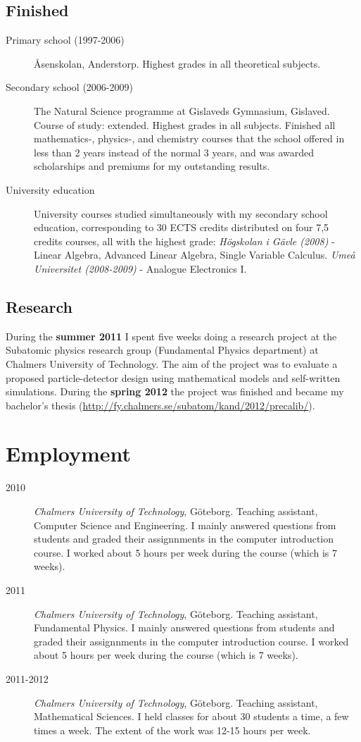 \subsection*{Finished}
\begin{description}
\item[Primary school (1997-2006)] Åsenskolan, Anderstorp. Highest grades in all theoretical subjects.
\item[Secondary school (2006-2009)] The Natural Science programme at Gislaveds Gymnasium, Gislaved. Course of study: extended. Highest grades in all subjects. Finished all mathematics-, physics-, and chemistry courses that the school offered in less than 2 years instead of the normal 3 years, and was awarded scholarships and premiums for my outstanding results.
\item[University education] University courses studied simultaneously with my secondary school education, corresponding to 30 ECTS credits distributed on four 7,5 credits courses, all with the highest grade: \emph{Högskolan i Gävle (2008)} - Linear Algebra, Advanced Linear Algebra, Single Variable Calculus. \emph{Umeå Universitet (2008-2009)} -  Analogue Electronics I.
\end{description}

\subsection*{Research}
During the {\bf summer 2011} I spent five weeks doing a research project at the Subatomic physics research group (Fundamental Physics department) at Chalmers University of Technology. The aim of the project was to evaluate a proposed particle-detector design using mathematical models and self-written simulations. During the {\bf spring 2012} the project was finished and became my bachelor's thesis (\url{http://fy.chalmers.se/subatom/kand/2012/precalib/}).

\section*{Employment}

\begin{description}
\item[2010]\emph{Chalmers University of Technology}, Göteborg. Teaching assistant, Computer Science and Engineering. I mainly answered questions from students and graded their assignnments in the computer introduction course. I worked about 5 hours per week during the course (which is 7 weeks). 
\item[2011]\emph{Chalmers University of Technology}, Göteborg. Teaching assistant, Fundamental Physics. I mainly answered questions from students and graded their assignnments in the computer introduction course. I worked about 5 hours per week during the course (which is 7 weeks). 
\item[2011-2012]\emph{Chalmers University of Technology}, Göteborg. Teaching assistant, Mathematical Sciences. I held classes for about 30 students a time, a few times a week. The extent of the work was 12-15 hours per week.
\end{description}


